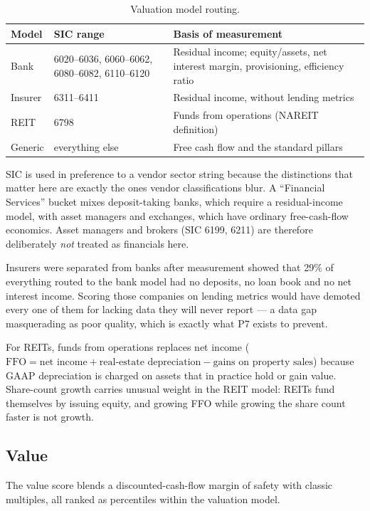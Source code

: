 \documentclass[11pt,a4paper]{article}
\begin{document}
\begin{table}[h]
\centering
\sffamily\small
\begin{tabular}{@{}lp{4.1cm}p{6.2cm}@{}}
\toprule
\textbf{Model} & \textbf{SIC range} & \textbf{Basis of measurement}\\
\midrule
Bank & 6020--6036, 6060--6062, 6080--6082, 6110--6120 & Residual income; equity/assets, net interest margin, provisioning, efficiency ratio\\
Insurer & 6311--6411 & Residual income, without lending metrics\\
REIT & 6798 & Funds from operations (NAREIT definition)\\
Generic & everything else & Free cash flow and the standard pillars\\
\bottomrule
\end{tabular}
\caption{Valuation model routing.}
\end{table}

SIC is used in preference to a vendor sector string because the distinctions
that matter here are exactly the ones vendor classifications blur. A
``Financial Services'' bucket mixes deposit-taking banks, which require a
residual-income model, with asset managers and exchanges, which have ordinary
free-cash-flow economics. Asset managers and brokers (SIC 6199, 6211) are
therefore deliberately \emph{not} treated as financials here.

Insurers were separated from banks after measurement showed that 29\% of
everything routed to the bank model had no deposits, no loan book and no net
interest income. Scoring those companies on lending metrics would have demoted
every one of them for lacking data they will never report --- a data gap
masquerading as poor quality, which is exactly what P7 exists to prevent.

For REITs, funds from operations replaces net income
($\text{FFO} = \text{net income} + \text{real-estate depreciation} - \text{gains
on property sales}$) because GAAP depreciation is charged on assets that in
practice hold or gain value. Share-count growth carries unusual weight in the
REIT model: REITs fund themselves by issuing equity, and growing FFO while
growing the share count faster is not growth.

\subsection{Value}

The value score blends a discounted-cash-flow margin of safety with classic
multiples, all ranked as percentiles within the valuation model.
\end{document}
